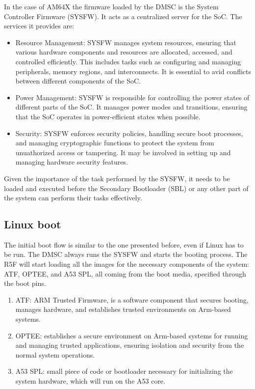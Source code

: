 In the case of AM64X the firmware loaded by the DMSC is the System Controller
Firmware (SYSFW). It acts as a centralized server for the SoC. The services it
provides are:

\begin{itemize}
    \item   Resource Management: SYSFW manages system resources, ensuring that
            various hardware components and resources are allocated, accessed,
            and controlled efficiently. This includes tasks such as configuring
            and managing peripherals, memory regions, and interconnects. It is
            essential to avid conflicts between different components of the SoC.
    \item   Power Management: SYSFW is responsible for controlling the power
            states of different parts of the SoC. It manages power modes and
            transitions, ensuring that the SoC operates in power-efficient
            states when possible.
    \item   Security: SYSFW enforces security policies, handling secure boot
            processes, and managing cryptographic functions to protect the
            system from unuathorized access or tampering. It may be involved in
            setting up and managing hardware security features.
\end{itemize}

Given the importance of the task performed by the SYSFW, it needs to be loaded
and executed before the Secondary Bootloader (SBL) or any other part of the
system can perform their tasks effectively.

\subsection{Linux boot}

The initial boot flow is similar to the one presented before, even if Linux
has to be run.
The DMSC always runs the SYSFW and starts the booting process.
The R5F will start loading all the images for the necessary components of the
system: ATF, OPTEE, and A53 SPL, all coming from the boot media, specified
through the boot pins.

\begin{enumerate}
    \item   ATF: ARM Trusted Firmware, is a software component that secures
            booting, manages hardware, and establishes trusted environments
            on Arm-based systems.
    \item   OPTEE: establishes a secure environment on Arm-based systems for
            running and managing trusted applications, ensuring isolation and
            security from the normal system operations.
    \item   A53 SPL: small piece of code or bootloader necessary for
            initializing the system hardware, which will run on the A53 core.
\end{enumerate}

